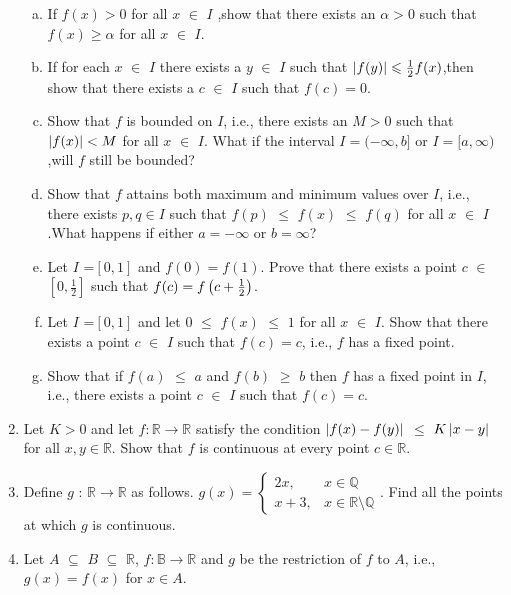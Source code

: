 \documentclass[journal,12pt,onecolumn]{IEEEtran}
\begin{document}
\begin{enumerate}
\setlength\itemsep{2em}
\begin{enumerate}[(a)]
\item If $f(x)>0$ for all $x$ $\in$ $I$ ,show that there exists an $\alpha>0$ such that $f(x)\geqslant\alpha$ for all $x$ $\in$ $I$.
\item If for each $x$ $\in$ $I$ there exists a $y$ $\in$ $I$ such that $\left\vert f(y)\right\vert\leqslant\frac{1}{2}f(x)$,then show that there exists a $c$ $\in$ $I$ such that $f(c)=0$.
\item Show that $f$ is bounded on $I$, i.e., there exists an $M>0$ such that $\left\vert f(x)\right\vert < M$  for all $x$ $\in$ $I$. 
What if the interval $I=(-\infty,b]$ or $I=[a,\infty)$,will $f$ still be bounded? 
\item Show that $f$ attains both maximum and minimum values over $I$, i.e., there exists $p,q \in I$ such that $f(p)$ $\leqslant$ $f(x)$ $\leqslant$ $f(q)$ for all $x$ $\in$ $I$.What happens if either $a=-\infty$ or $b=\infty$? 
\item Let $I$ =$[0,1]$ and $f(0)=f(1)$. Prove that there exists a point $c$ $\in$ $[0,\frac{1}{2}]$ such that $f(c)=f\left(c+\frac{1}{2}\right)$.
\item Let $I$ =$[0,1]$ and let $0$ $\leqslant$ $f(x)$ $\leqslant$ $1$ for all $x$ $\in$ $I$. Show that there exists a point $c$ $\in$ $I$ such that $f(c)=c$, i.e., $f$ has a fixed point.
\item Show that if $f(a)$ $\leqslant$ $a$ and $f(b)$ $\geqslant$ $b$ then $f$ has a fixed point in $I$, i.e., there exists a point $c$ $\in$ $I$ such that $f(c)=c$.
\end{enumerate}


\item Let $K>0$ and let $f:\mathbb{R} \rightarrow \mathbb{R}$ satisfy the condition $\left\vert f(x)-f(y)\right\vert$ $\leqslant$ $K\left\vert x-y\right\vert$ for all $x,y\in\mathbb{R}$. Show that $f$ is continuous at every point $c\in\mathbb{R}$.

\item Define $g$ : $\mathbb{R}\rightarrow\mathbb{R}$ as follows.
$
g(x)=\begin{cases}
2x,& x\in\mathbb{Q} \\
x+3,& x\in\mathbb{R} \setminus \mathbb{Q}
\end{cases}
.$
Find all the points at which $g$ is continuous.

\item Let $A$ $\subseteq$ $B$ $\subseteq$ $\mathbb{R}$, $f:\mathbb{B} \rightarrow \mathbb{R}$ and $g$ be the restriction of $f$ to $A$, i.e., $g(x)=f(x)$ for $x\in A$.


\end{enumerate}
\end{document}
